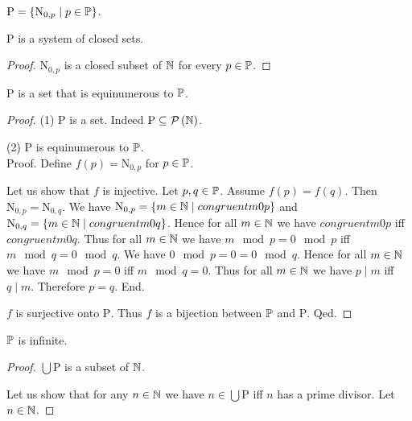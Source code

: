 \documentclass{article}
\newcommand{\arithseq}[2]{\mathrm{N}_{#1,#2}}
\newcommand{\Ps}{\mathrm{P}}
\begin{document}
  \begin{forthel}
    \begin{definition}
      $\Ps = \{ \arithseq{0}{p} \mid p \in \Prime \}$.
    \end{definition}

    \begin{lemma}
      $\Ps$ is a system of closed sets.
    \end{lemma}
    \begin{proof}
      $\arithseq{0}{p}$ is a closed subset of $\mathbb{N}$ for every $p \in \mathbb{P}$.
    \end{proof}

    \begin{lemma}
      $\Ps$ is a set that is equinumerous to $\mathbb{P}$.
    \end{lemma}
    \begin{proof}
      (1) $\Ps$ is a set.
      Indeed $\Ps \subseteq \pow{\Nat}$.

      (2) $\Ps$ is equinumerous to $\mathbb{P}$. \\
      Proof.
        Define $f(p) = \arithseq{0}{p}$ for $p \in \mathbb{P}$.

        Let us show that $f$ is injective.
          Let $p, q \in \mathbb{P}$.
          Assume $f(p) = f(q)$.
          Then $\arithseq{0}{p} = \arithseq{0}{q}$.
          We have $\arithseq{0}{p} = \{ m \in \Nat \mid congruent{m}{0}{p} \}$ and
          $\arithseq{0}{q} = \{ m \in \Nat \mid congruent{m}{0}{q} \}$.
          Hence for all $m \in \mathbb{N}$ we have $congruent{m}{0}{p}$ iff
          $congruent{m}{0}{q}$.
          Thus for all $m \in \mathbb{N}$ we have $m \mod p = 0 \mod p$ iff
          $m \mod q = 0 \mod q$.
          We have $0 \mod p = 0 = 0 \mod q$.
          Hence for all $m \in \mathbb{N}$ we have $m \mod p = 0$ iff $m \mod q = 0$.
          Thus for all $m \in \mathbb{N}$ we have $p \mid m$ iff $q \mid m$.
          Therefore $p = q$.
        End.

        $f$ is surjective onto $\Ps$.
        Thus $f$ is a bijection between $\mathbb{P}$ and $\Ps$.
      Qed.
    \end{proof}

    \begin{theorem}[Furstenberg]
      $\mathbb{P}$ is infinite.
    \end{theorem}
    \begin{proof}
      $\bigcup \Ps$ is a subset of $\mathbb{N}$.

      Let us show that for any $n \in \mathbb{N}$ we have $n \in \bigcup \Ps$ iff $n$
      has a prime divisor.
        Let $n \in \mathbb{N}$.


\end{proof}
\end{forthel}
\end{document}
